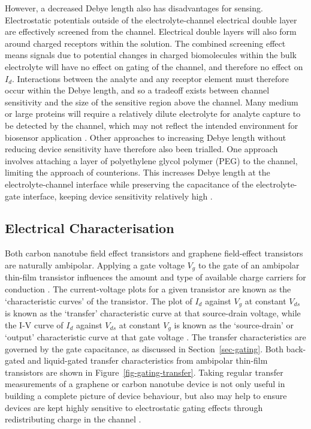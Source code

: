 \documentclass[
  a4paper,
]{scrbook}
\begin{document}
However, a decreased Debye length also has disadvantages for sensing.
Electrostatic potentials outside of the electrolyte-channel electrical
double layer are effectively screened from the channel. Electrical
double layers will also form around charged receptors within the
solution. The combined screening effect means signals due to potential
changes in charged biomolecules within the bulk electrolyte will have no
effect on gating of the channel, and therefore no effect on \(I_d\).
Interactions between the analyte and any receptor element must therefore
occur within the Debye length, and so a tradeoff exists between channel
sensitivity and the size of the sensitive region above the channel. Many
medium or large proteins will require a relatively dilute electrolyte
for analyte capture to be detected by the channel, which may not reflect
the intended environment for biosensor application
\autocite{Stern2007,Piccinini2018,Shkodra2021}. Other approaches to
increasing Debye length without reducing device sensitivity have
therefore also been trialled. One approach involves attaching a layer of
polyethylene glycol polymer (PEG) to the channel, limiting the approach
of counterions. This increases Debye length at the electrolyte-channel
interface while preserving the capacitance of the electrolyte-gate
interface, keeping device sensitivity relatively high
\autocite{Gao2016,Kesler2020,Albarghouthi2022}.

\hypertarget{electrical-characterisation}{%
\subsection{Electrical
Characterisation}\label{electrical-characterisation}}

Both carbon nanotube field effect transistors and graphene field-effect
transistors are naturally ambipolar. Applying a gate voltage \(V_g\) to
the gate of an ambipolar thin-film transistor influences the amount and
type of available charge carriers for conduction
\autocite{Avouris2007,Tran2016,Heller2009a}. The current-voltage plots
for a given transistor are known as the `characteristic curves' of the
transistor. The plot of \(I_d\) against \(V_g\) at constant \(V_{ds}\)
is known as the `transfer' characteristic curve at that source-drain
voltage, while the I-V curve of \(I_d\) against \(V_{ds}\) at constant
\(V_g\) is known as the `source-drain' or `output' characteristic curve
at that gate voltage \autocite{Petti2016,Shkodra2021}. The transfer
characteristics are governed by the gate capacitance, as discussed in
Section~\ref{sec-gating}. Both back-gated and liquid-gated transfer
characteristics from ambipolar thin-film transistors are shown in
Figure~\ref{fig-gating-transfer}. Taking regular transfer measurements
of a graphene or carbon nanotube device is not only useful in building a
complete picture of device behaviour, but also may help to ensure
devices are kept highly sensitive to electrostatic gating effects
through redistributing charge in the channel \autocite{Noyce2019}.
\end{document}
